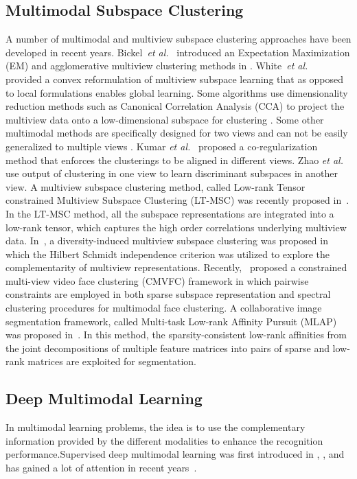 \documentclass[journal]{IEEEtran}
\newcommand{\etal}{\textit{et al.}}
\begin{document}
\subsection{Multimodal Subspace Clustering}
A number of multimodal and multiview subspace clustering approaches have been developed in recent years.  Bickel~\etal~  introduced an Expectation Maximization (EM) and agglomerative multiview clustering methods in \cite{CVPR2014_multi_feature_SC}.  White~\etal~\cite{Convex_multiview_NIPS2012_4632} provided a convex reformulation of multiview subspace learning that as opposed to local formulations enables global learning.  Some algorithms use dimensionality reduction methods such as Canonical Correlation Analysis (CCA) to project the multiview data onto a low-dimensional subspace for clustering \cite{Chaudhuri, multiview_SC_AAAI_2014}.  Some other multimodal methods are specifically designed for two views and can not be easily generalized to multiple views \cite{Bickel, desa05spectral}. Kumar \etal~\cite{Kumar} proposed a co-regularization method that enforces the clusterings to be aligned in different views.  Zhao \etal~\cite{Zhao} use output of clustering in one view to learn discriminant subspaces in another view.   A multiview subspace clustering method, called Low-rank Tensor constrained Multiview Subspace Clustering (LT-MSC) was recently proposed in~\cite{zhang2015low}.		 In the LT-MSC method, all the subspace representations are integrated into a low-rank tensor, which captures the high order correlations underlying multiview data.		  In~\cite{diversity_multiview_SC}, a diversity-induced multiview subspace clustering was proposed in which the Hilbert Schmidt independence criterion was utilized to explore the complementarity of multiview representations.		  Recently,~\cite{cao2015constrained} proposed a constrained multi-view video face clustering (CMVFC) framework in which pairwise constraints are employed in both sparse subspace representation and spectral clustering procedures for multimodal face clustering.		  A collaborative image segmentation framework,  called  Multi-task  Low-rank  Affinity  Pursuit (MLAP) was proposed in~\cite{MultiTask_LRR_ICCV2011}.		 In this method, the sparsity-consistent low-rank affinities from the joint decompositions
of multiple feature matrices into pairs of sparse and low-rank matrices are exploited for segmentation.		

\subsection{Deep Multimodal Learning} In multimodal learning problems, the idea is to use the complementary information provided by the different modalities to enhance the recognition performance.Supervised deep multimodal learning was first introduced in \cite{ngiam2011multimodal},  \cite{srivastava2012multimodal}, and  has gained a lot of attention in recent years~\cite{kim2016multimodal,neverova2016moddrop,kahou2016emonets}. 
\end{document}

